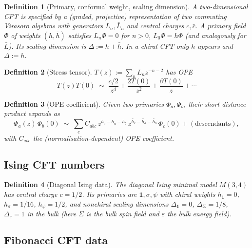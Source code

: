 \documentclass[11pt,a4paper]{article}
\newtheorem{definition}{Definition}[section]
\theoremstyle{definition}
\newcommand{\one}{\mathbf{1}}
\begin{document}
\begin{definition}[Primary, conformal weight, scaling dimension]\label{def:primary}
A two-dimensional CFT is specified by a (graded, projective) representation
of two commuting Virasoro algebras with generators $L_n,\bar L_n$ and central
charges $c,\bar c$. A \emph{primary} field $\Phi$ of weights $(h,\bar h)$
satisfies $L_n\Phi = 0$ for $n>0$, $L_0\Phi = h\Phi$ (and analogously for
$\bar L$). Its \emph{scaling dimension} is $\Delta := h+\bar h$. In a
\emph{chiral} CFT only $h$ appears and $\Delta := h$.
\end{definition}

\begin{definition}[Stress tensor]\label{def:stress}
$T(z) := \sum_n L_n z^{-n-2}$ has OPE
\[
T(z)T(0) \;\sim\; \frac{c/2}{z^{4}} + \frac{2T(0)}{z^{2}} + \frac{\partial T(0)}{z} + \cdots
\]
\end{definition}

\begin{definition}[OPE coefficient]\label{def:OPE}
Given two primaries $\Phi_a, \Phi_b$, their short-distance product expands as
\[
\Phi_a(z)\,\Phi_b(0) \;\sim\; \sum_c C_{abc}\,z^{h_c-h_a-h_b}\,\bar z^{\bar h_c-\bar h_a-\bar h_b}\,\Phi_c(0) + (\text{descendants}),
\]
with $C_{abc}$ the (normalisation-dependent) OPE coefficient.
\end{definition}

\subsection{Ising CFT numbers}

\begin{definition}[Diagonal Ising data]\label{def:isingcft}
The diagonal Ising minimal model $M(3,4)$ has central charge $c=1/2$.
Its primaries are $\one,\sigma,\psi$ with chiral weights $h_\one=0$,
$h_\sigma=1/16$, $h_\psi=1/2$, and nonchiral scaling dimensions
$\Delta_\one=0$, $\Delta_\Sigma=1/8$, $\Delta_\varepsilon=1$ in the bulk
(here $\Sigma$ is the bulk spin field and $\varepsilon$ the bulk energy
field).
\end{definition}

\subsection{Fibonacci CFT data}
\end{document}
